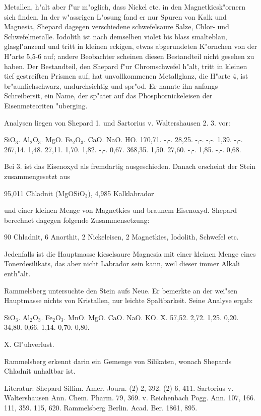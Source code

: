 \documentclass[a4paper, 11pt, oneside]{article}
\begin{document}
Metallen, h"alt aber f"ur m"oglich, dass Nickel etc. in den Magnetkiesk"ornern sich finden. In der w"assrigen L"osung fand er nur Spuren von Kalk und Magnesia, Shepard dagegen verschiedene schwefelsaure Salze, Chlor- und Schwefelmetalle. Iodolith ist nach demselben violet bis blass smalteblau, glasgl"anzend und tritt in kleinen eckigen, etwas abgerundeten K"ornchen von der H"arte 5,5-6 auf; andere Beobachter scheinen diesen Bestandteil nicht gesehen zu haben. Der Bestandteil, den Shepard f"ur Chromschwefel h"alt, tritt in kleinen tief gestreiften Prismen auf, hat unvollkommenen Metallglanz, die H"arte 4, ist br"aunlichschwarz, undurchsichtig und spr"od. Er nannte ihn anfangs Schreibersit, ein Name, der sp"ater auf das Phosphornickeleisen der Eisenmeteoriten "uberging.

Analysen liegen von Shepard 1. und Sartorius v. Waltershausen 2. 3. vor:

SiO$_{3}$. Al$_{2}$O$_{3}$. MgO. Fe$_{2}$O$_{3}$. CaO. NaO. HO.  
1\. 70,71. -,-. 28,25. -,-. -,-. 1,39. -,-.  
2\. 67,14. 1,48. 27,11. 1,70. 1,82. -,-. 0,67.  
3\. 68,35. 1,50. 27,60. -,-. 1,85. -,-. 0,68.

Bei 3. ist das Eisenoxyd als fremdartig ausgeschieden. Danach erscheint der Stein zusammengesetzt aus

95,011 Chladnit (MgOSiO$_{3}$),
4,985 Kalklabrador

und einer kleinen Menge von Magnetkies und braunem Eisenoxyd. Shepard berechnet dagegen folgende Zusammensetzung:

90 Chladnit,  
6 Anorthit,  
2 Nickeleisen,  
2 Magnetkies, Iodolith, Schwefel etc.

Jedenfalls ist die Hauptmasse kieselsaure Magnesia mit einer kleinen Menge eines Tonerdesilikats, das aber nicht Labrador sein kann, weil dieser immer Alkali enth"alt.

Rammelsberg untersuchte den Stein aufs Neue. Er bemerkte an der wei"sen Hauptmasse nichts von Kristallen, nur leichte Spaltbarkeit. Seine Analyse ergab:

SiO$_{3}$. Al$_{2}$O$_{3}$. Fe$_{2}$O$_{3}$. MnO. MgO. CaO. NaO. KO. X.  
57,52. 2,72. 1,25. 0,20. 34,80. 0,66. 1,14. 0,70. 0,80.

X. Gl"uhverlust.

Rammelsberg erkennt darin ein Gemenge von Silikaten, wonach Shepards Chladnit unhaltbar ist.

Literatur: Shepard Sillim. Amer. Journ. (2) 2, 392. (2) 6, 411. Sartorius v. Waltershausen Ann. Chem. Pharm. 79, 369. v. Reichenbach Pogg. Ann. 107, 166. 111, 359. 115, 620. Rammelsberg Berlin. Acad. Ber. 1861, 895.
\end{document}
